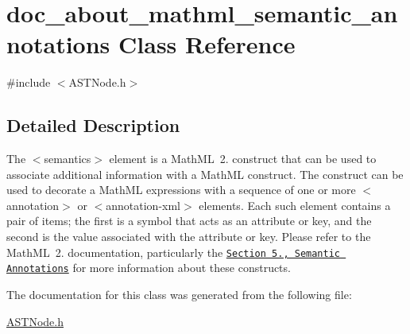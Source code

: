 \hypertarget{classdoc__about__mathml__semantic__annotations}{}\section{doc\+\_\+about\+\_\+mathml\+\_\+semantic\+\_\+annotations Class Reference}
\label{classdoc__about__mathml__semantic__annotations}


{\ttfamily \#include $<$A\+S\+T\+Node.\+h$>$}



\subsection{Detailed Description}
The {\ttfamily $<$semantics$>$} element is a Math\+ML~2. construct that can be used to associate additional information with a Math\+ML construct. The construct can be used to decorate a Math\+ML expressions with a sequence of one or more {\ttfamily $<$annotation$>$} or {\ttfamily $<$annotation-\/xml$>$} elements. Each such element contains a pair of items; the first is a symbol that acts as an attribute or key, and the second is the value associated with the attribute or key. Please refer to the Math\+ML~2. documentation, particularly the \href{http://www.w3.org/TR/2007/WD-MathML3-20071005/chapter5.html#mixing.semantic.annotations}{\tt Section 5., Semantic Annotations} for more information about these constructs. 

The documentation for this class was generated from the following file\+:\begin{DoxyCompactItemize}
\item 
\hyperlink{_a_s_t_node_8h}{A\+S\+T\+Node.\+h}\end{DoxyCompactItemize}

